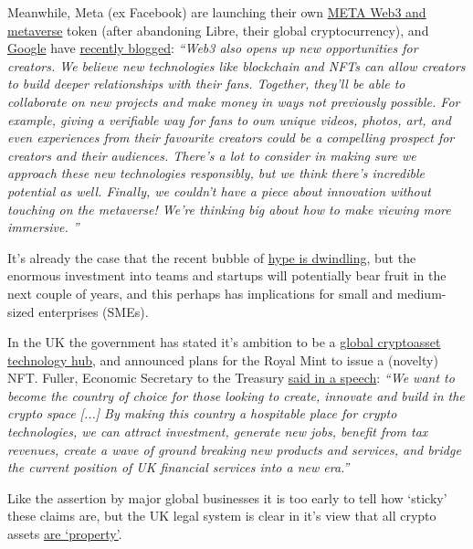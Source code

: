 \documentclass[
	12pt, %
	fleqn, %
	a4paper, %
	oneside, %
]{LegrandOrangeBook}
\begin{document}
Meanwhile, Meta (ex Facebook) are launching their own \href{https://archive.ph/coyp2}{META Web3 and metaverse} token (after abandoning Libre, their global cryptocurrency), and \href{https://www.cnbc.com/2022/05/06/googles-cloud-group-forms-web3-product-and-engineering-team.html}{Google} have \href{https://blog.youtube/inside-youtube/innovations-for-2022-at-youtube/}{recently blogged}: \textit{``Web3 also opens up new opportunities for creators. We believe new technologies like blockchain and NFTs can allow creators to build deeper relationships with their fans. Together, they'll be able to collaborate on new projects and make money in ways not previously possible. For example, giving a verifiable way for fans to own unique videos, photos, art, and even experiences from their favourite creators could be a compelling prospect for creators and their audiences. There's a lot to consider in making sure we approach these new technologies responsibly, but we think there's incredible potential as well. Finally, we couldn't have a piece about innovation without touching on the metaverse! We're thinking big about how to make viewing more immersive. ''}\par
It's already the case that the recent bubble of \href{https://www.forbes.com/sites/paultassi/2022/03/10/interest-in-nfts-and-the-metaverse-is-falling-fast/?}{hype is dwindling}, but the enormous investment into teams and startups will potentially bear fruit in the next couple of years, and this perhaps has implications for small and medium-sized enterprises (SMEs). \par
In the UK the government has stated it's ambition to be a \href{https://www.gov.uk/government/news/government-sets-out-plan-to-make-uk-a-global-cryptoasset-technology-hub}{global cryptoasset technology hub}, and announced plans for the Royal Mint to issue a (novelty) NFT. Fuller, Economic Secretary to the Treasury \href{https://drive.google.com/file/d/19ZYKLeT-ds3TueTpqSM22MUqB4gmN_Pl/view}{said in a speech}: \textit{``We want to become the country of choice for those looking to create, innovate and build in the crypto space [...] By making this country a hospitable place for crypto technologies, we can attract investment, generate new jobs, benefit from tax revenues, create a wave of ground breaking new products and services, and bridge the current position of UK financial services into a new era.''}\par
Like the assertion by major global businesses it is too early to tell how `sticky' these claims are, but the UK legal system is clear in it's view that all crypto assets \href{https://blockchain.bakermckenzie.com/2020/02/03/uk-court-confirms-bitcoins-status-as-property/}{are `property'}.\par
\end{document}
